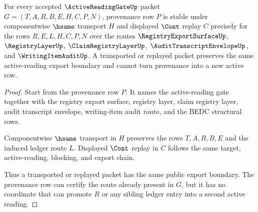 \begin{theorem}
\label{thm:active-reading-gate-provenance-stability-obligation}
For every accepted $\ActiveReadingGateUp$ packet $G=(T,A,R,B,E,H,C,P,N)$, provenance row $P$ is stable under componentwise $\hsame$ transport $H$ and displayed $\Cont$ replay $C$ precisely for the rows $R,E,L,H,C,P,N$ over the routes $\RegistryExportSurfaceUp$, $\RegistryLayerUp$, $\ClaimRegistryLayerUp$, $\AuditTranscriptEnvelopeUp$, and $\WritingItemAuditUp$. A transported or replayed packet preserves the same active-reading export boundary and cannot turn provenance into a new active row.
\end{theorem}
\begin{proof}
Start from the provenance row $P$. It names the active-reading gate together with the registry export surface, registry layer, claim registry layer, audit transcript envelope, writing-item audit route, and the BEDC structural rows.

Componentwise $\hsame$ transport in $H$ preserves the rows $T,A,R,B,E$ and the induced ledger route $L$. Displayed $\Cont$ replay in $C$ follows the same target, active-reading, blocking, and export chain.

Thus a transported or replayed packet has the same public export boundary. The provenance row can certify the route already present in $G$, but it has no coordinate that can promote $R$ or any sibling ledger entry into a second active reading.
\end{proof}

